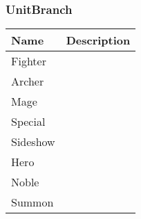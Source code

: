 \subsubsection{UnitBranch}
\label{UnitBranch}
\begin{tabularx}{\linewidth}{| l | X |}
\hline
\textbf{Name} & \textbf{Description} \\
\hline
Fighter &\\
\hline
Archer &\\
\hline
Mage &\\
\hline
Special &\\
\hline
Sideshow &\\
\hline
Hero &\\
\hline
Noble &\\
\hline
Summon &\\
\hline
\end{tabularx}